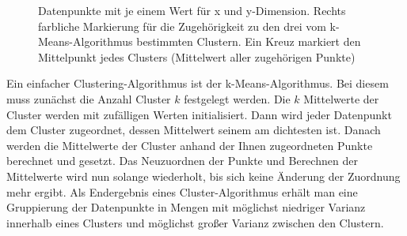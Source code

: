 \documentclass[
	12pt,
	a4paper,
	BCOR10mm,
	DIV14,
	listof=totoc,
	bibliography=totoc,
	headsepline
]{scrreprt}
\begin{document}
\begin{figure} [h]
	\hfill
	\caption{Datenpunkte mit je einem Wert für x und y-Dimension. Rechts farbliche Markierung für die Zugehörigkeit zu den drei vom k-Means-Algorithmus bestimmten Clustern. Ein Kreuz markiert den Mittelpunkt jedes Clusters (Mittelwert aller zugehörigen Punkte)}
	\label{fig:clustering_beispiel}
\end{figure} 

Ein einfacher Clustering-Algorithmus ist der k-Means-Algorithmus. Bei diesem muss zunächst die Anzahl Cluster $k$ festgelegt werden. Die $k$ Mittelwerte der Cluster werden mit zufälligen Werten initialisiert. Dann wird jeder Datenpunkt dem Cluster zugeordnet, dessen Mittelwert seinem am dichtesten ist. Danach werden die Mittelwerte der Cluster anhand der Ihnen zugeordneten Punkte berechnet und gesetzt. Das Neuzuordnen der Punkte und Berechnen der Mittelwerte wird nun solange wiederholt, bis sich keine Änderung der Zuordnung mehr ergibt. Als Endergebnis eines Cluster-Algorithmus erhält man eine Gruppierung der Datenpunkte in Mengen mit möglichst niedriger Varianz innerhalb eines Clusters und möglichst großer Varianz zwischen den Clustern.
\end{document}
